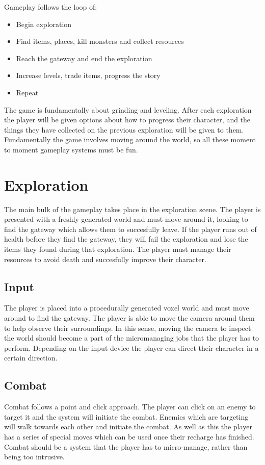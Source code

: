\documentclass[a4paper]{scrreprt}
\begin{document}
Gameplay follows the loop of:

    \begin{itemize}
        \item Begin exploration
        \item Find items, places, kill monsters and collect resources
        \item Reach the gateway and end the exploration
        \item Increase levels, trade items, progress the story
        \item Repeat
    \end{itemize}

The game is fundamentally about grinding and leveling.
After each exploration the player will be given options about how to progress their character, and the things they have collected on the previous exploration will be given to them.
Fundamentally the game involves moving around the world, so all these moment to moment gameplay systems must be fun.

\section{Exploration}
The main bulk of the gameplay takes place in the exploration scene.
The player is presented with a freshly generated world and must move around it, looking to find the gateway which allows them to succesfully leave.
If the player runs out of health before they find the gateway, they will fail the exploration and lose the items they found during that exploration.
The player must manage their resources to avoid death and succesfully improve their character.

\subsection{Input}
The player is placed into a procedurally generated voxel world and must move around to find the gateway.
The player is able to move the camera around them to help observe their surroundings.
In this sense, moving the camera to inspect the world should become a part of the micromanaging jobs that the player has to perform.
Depending on the input device the player can direct their character in a certain direction.

\subsection{Combat}
Combat follows a point and click approach.
The player can click on an enemy to target it and the system will initiate the combat.
Enemies which are targeting will walk towards each other and initiate the combat.
As well as this the player has a series of special moves which can be used once their recharge has finished.
Combat should be a system that the player has to micro-manage, rather than being too intrusive.
\end{document}
